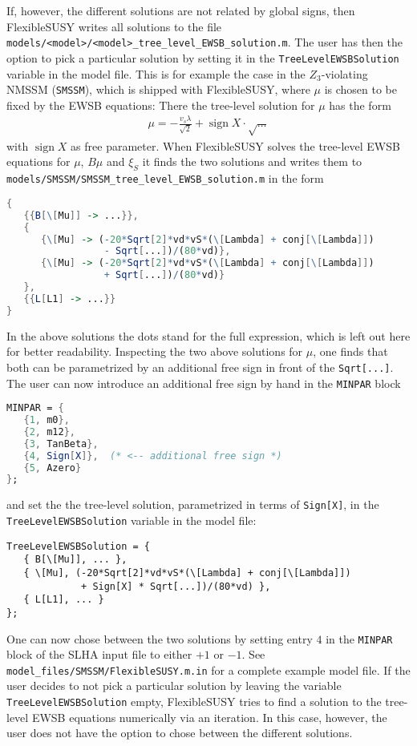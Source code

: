 \documentclass[final,3p,11pt,pdflatex]{elsarticle}
\makeatletter
\newcommand{\fs}{FlexibleSUSY\@\xspace}
\newcommand{\code}[1]{\lstinline|#1|}  %
\DeclareMathOperator{\sign}{sign}
\makeatother
\begin{document}
If, however, the different solutions are not related by global signs,
then \fs writes all solutions to the file
\code{models/<model>/<model>_tree_level_EWSB_solution.m}.  The user
has then the option to pick a particular solution by setting it in the
\code{TreeLevelEWSBSolution} variable in the model file.  This is for
example the case in the $Z_3$-violating NMSSM (\code{SMSSM}), which is shipped with \fs, where
$\mu$ is chosen to be fixed by the EWSB equations: There the
tree-level solution for $\mu$ has the form
%
\begin{align}
  \mu = -\frac{v_s \lambda}{\sqrt{2}} + \sign X \cdot \sqrt{\ldots}
\end{align}
%
with $\sign X$ as free parameter.  When \fs solves the tree-level EWSB
equations for $\mu$, $B\mu$ and $\xi_S$ it finds the two solutions and
writes them to \code{models/SMSSM/SMSSM_tree_level_EWSB_solution.m} in
the form
%
\begin{lstlisting}[language=Mathematica]
{
   {{B[\[Mu]] -> ...}},
   {
      {\[Mu] -> (-20*Sqrt[2]*vd*vS*(\[Lambda] + conj[\[Lambda]])
                 - Sqrt[...])/(80*vd)},
      {\[Mu] -> (-20*Sqrt[2]*vd*vS*(\[Lambda] + conj[\[Lambda]])
                 + Sqrt[...])/(80*vd)}
   },
   {{L[L1] -> ...}}
}
\end{lstlisting}
%
In the above solutions the dots stand for the full expression, which
is left out here for better readability.  Inspecting the two above
solutions for $\mu$, one finds that both can be parametrized by an
additional free sign in front of the \code{Sqrt[...]}.  The user can
now introduce an additional free sign by hand in the \code{MINPAR}
block
%
\begin{lstlisting}[language=Mathematica]
MINPAR = {
   {1, m0},
   {2, m12},
   {3, TanBeta},
   {4, Sign[X]},  (* <-- additional free sign *)
   {5, Azero}
};
\end{lstlisting}
%
and set the the tree-level solution, parametrized in terms of
\code{Sign[X]}, in the \code{TreeLevelEWSBSolution} variable in
the model file:
%
\begin{lstlisting}
TreeLevelEWSBSolution = {
   { B[\[Mu]], ... },
   { \[Mu], (-20*Sqrt[2]*vd*vS*(\[Lambda] + conj[\[Lambda]])
             + Sign[X] * Sqrt[...])/(80*vd) },
   { L[L1], ... }
};
\end{lstlisting}
%
One can now chose between the two solutions by setting entry $4$ in
the \code{MINPAR} block of the SLHA input file to either $+1$ or $-1$.
See \code{model_files/SMSSM/FlexibleSUSY.m.in} for a complete example
model file.  If the user decides to not pick a particular solution by
leaving the variable \code{TreeLevelEWSBSolution} empty, \fs tries to
find a solution to the tree-level EWSB equations numerically via an
iteration.  In this case, however, the user does not have the option
to chose between the different solutions.
\end{document}
